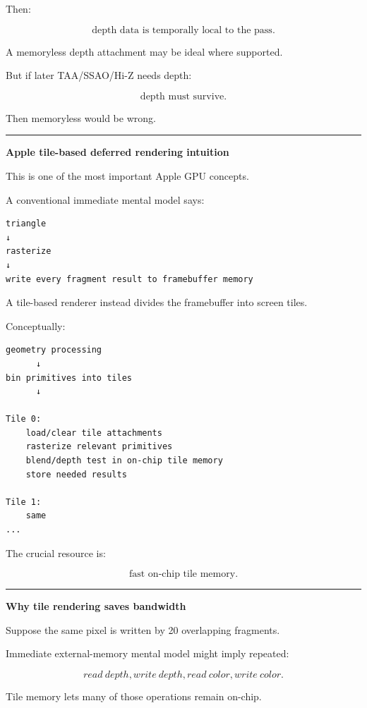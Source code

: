 Then:

\[
\boxed{
\text{depth data is temporally local to the pass}.
}
\]

A memoryless depth attachment may be ideal where supported.

But if later TAA/SSAO/Hi-Z needs depth:

\[
\boxed{
\text{depth must survive}.
}
\]

Then memoryless would be wrong.

\begin{center}\rule{0.5\linewidth}{0.5pt}\end{center}

\textbf{Apple tile-based deferred rendering intuition}

This is one of the most important Apple GPU concepts.

A conventional immediate mental model says:

\begin{verbatim}
triangle
↓
rasterize
↓
write every fragment result to framebuffer memory
\end{verbatim}

A tile-based renderer instead divides the framebuffer into screen tiles.

Conceptually:

\begin{verbatim}
geometry processing
      ↓
bin primitives into tiles
      ↓

Tile 0:
    load/clear tile attachments
    rasterize relevant primitives
    blend/depth test in on-chip tile memory
    store needed results

Tile 1:
    same
...
\end{verbatim}

The crucial resource is:

\[
\boxed{
\text{fast on-chip tile memory}.
}
\]

\begin{center}\rule{0.5\linewidth}{0.5pt}\end{center}

\textbf{Why tile rendering saves bandwidth}

Suppose the same pixel is written by 20 overlapping fragments.

Immediate external-memory mental model might imply repeated:

\[
read\ depth,
write\ depth,
read\ color,
write\ color.
\]

Tile memory lets many of those operations remain on-chip.


